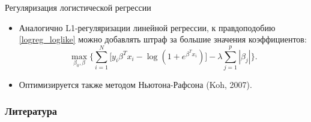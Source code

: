 \documentclass[9pt]{beamer}
\begin{document}
\begin{frame}{Регуляризация логистической регрессии}
\begin{itemize}
    \item Аналогично L1-регуляризации линейной регрессии, к правдоподобию \ref{logreg_loglike} можно добавлять штраф за большие значения коэффициентов:
    $$\max_{\beta_0,\beta} \Bigg\{ \sum_{i=1}^N \Big[ y_i\beta^T x_i - \log (1+e^{\beta^T x_i})\Big] -\lambda \sum_{j=1}^p |\beta_j| \Bigg\}.$$
    \item Оптимизируется также методом Ньютона-Рафсона (Koh, 2007).
\end{itemize}
    
\end{frame}

\begin{frame}[allowframebreaks]
    \frametitle{Литература}
    
    \nocite{esl}
    
\end{frame}
\end{document}
